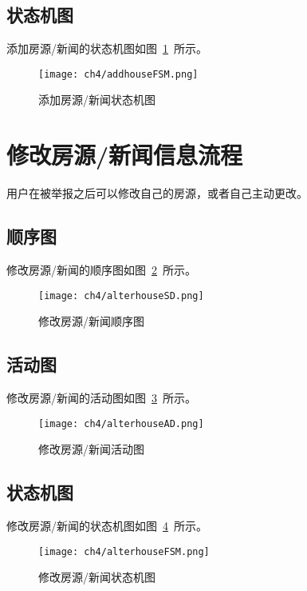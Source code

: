 \subsection{状态机图}
添加房源/新闻的状态机图如图~\ref{fig:addhouseFSM}~所示。
\begin{figure}[htbp]
    \centering
    \texttt{[image: ch4/addhouseFSM.png]}
    \caption{添加房源/新闻状态机图}\label{fig:addhouseFSM}
    \vspace{\baselineskip} %
\end{figure}

\section{修改房源/新闻信息流程}
用户在被举报之后可以修改自己的房源，或者自己主动更改。
\subsection{顺序图}
修改房源/新闻的顺序图如图~\ref{fig:alterhouseSD}~所示。
\begin{figure}[htbp]
    \centering
    \texttt{[image: ch4/alterhouseSD.png]}
    \caption{修改房源/新闻顺序图}\label{fig:alterhouseSD}
    \vspace{\baselineskip} %
\end{figure}
\subsection{活动图}
修改房源/新闻的活动图如图~\ref{fig:alterhouseAD}~所示。
\begin{figure}[htbp]
    \centering
    \texttt{[image: ch4/alterhouseAD.png]}
    \caption{修改房源/新闻活动图}\label{fig:alterhouseAD}
    \vspace{\baselineskip} %
\end{figure}
\subsection{状态机图}
修改房源/新闻的状态机图如图~\ref{fig:alterhouseFSM}~所示。
\begin{figure}[htbp]
    \centering
    \texttt{[image: ch4/alterhouseFSM.png]}
    \caption{修改房源/新闻状态机图}\label{fig:alterhouseFSM}
    \vspace{\baselineskip} %
\end{figure}

